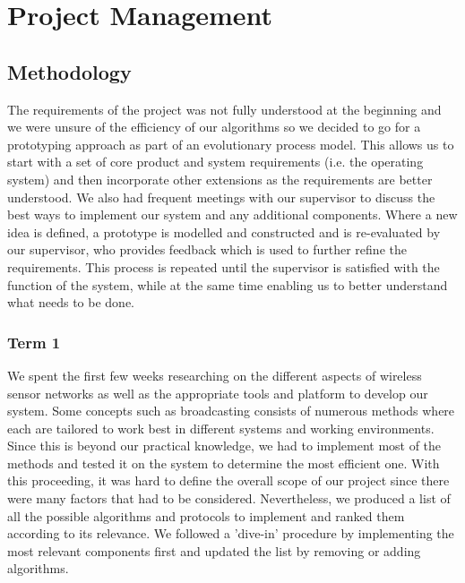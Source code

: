 \section{Project Management}

\subsection{Methodology}

The requirements of the project was not fully understood at the beginning and we were unsure of the efficiency of our algorithms so we decided to go for a prototyping approach as part of an evolutionary process model. This allows us to start with a set of core product and system requirements (i.e. the operating system) and then incorporate other extensions as the requirements are better understood. We also had frequent meetings with our supervisor to discuss the best ways to implement our system and any additional components. Where a new idea is defined, a prototype is modelled and constructed and is re-evaluated by our supervisor, who provides feedback which is used to further refine the requirements. This process is repeated until the supervisor is satisfied with the function of the system, while at the same time enabling us to better understand what needs to be done.

\subsubsection*{Term 1}

We spent the first few weeks researching on the different aspects of wireless sensor networks as well as the appropriate tools and platform to develop our system. Some concepts such as broadcasting consists of numerous methods where each are tailored to work best in different systems and working environments. Since this is beyond our practical knowledge, we had to implement most of the methods and tested it on the system to determine the most efficient one. With this proceeding, it was hard to define the overall scope of our project since there were many factors that had to be considered. Nevertheless, we produced a list of all the possible algorithms and protocols to implement and ranked them according to its relevance. We followed a 'dive-in' procedure by implementing the most relevant components first and updated the list by removing or adding algorithms.


